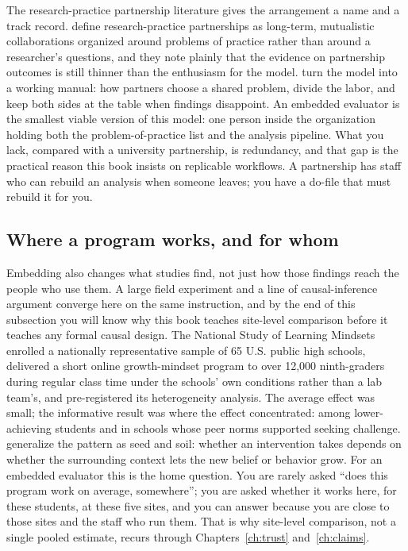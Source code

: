 \documentclass[
    a4paper,
    fontsize=10pt,
    twoside=true,
    numbers=noenddot,
]{kaobook}
\begin{document}
The research-practice partnership literature gives the arrangement a name and a track record. \textcite{coburn2016partnerships} define research-practice partnerships as long-term, mutualistic collaborations organized around problems of practice rather than around a researcher's questions, and they note plainly that the evidence on partnership outcomes is still thinner than the enthusiasm for the model. \textcite{penuel2017creating} turn the model into a working manual: how partners choose a shared problem, divide the labor, and keep both sides at the table when findings disappoint. An embedded evaluator is the smallest viable version of this model: one person inside the organization holding both the problem-of-practice list and the analysis pipeline. What you lack, compared with a university partnership, is redundancy, and that gap is the practical reason this book insists on replicable workflows. A partnership has staff who can rebuild an analysis when someone leaves; you have a do-file that must rebuild it for you.

\subsection{Where a program works, and for whom}\label{sec:ch01-home-question}
Embedding also changes what studies find, not just how those findings reach the people who use them. A large field experiment and a line of causal-inference argument converge here on the same instruction, and by the end of this subsection you will know why this book teaches site-level comparison before it teaches any formal causal design. The National Study of Learning Mindsets \parencite{yeager2019mindset} enrolled a nationally representative sample of 65 U.S. public high schools, delivered a short online growth-mindset program to over 12,000 ninth-graders during regular class time under the schools' own conditions rather than a lab team's, and pre-registered its heterogeneity analysis. The average effect was small; the informative result was where the effect concentrated: among lower-achieving students and in schools whose peer norms supported seeking challenge. \textcite{walton2020seed} generalize the pattern as seed and soil: whether an intervention takes depends on whether the surrounding context lets the new belief or behavior grow. For an embedded evaluator this is the home question. You are rarely asked \enquote{does this program work on average, somewhere}; you are asked whether it works here, for these students, at these five sites, and you can answer because you are close to those sites and the staff who run them. That is why site-level comparison, not a single pooled estimate, recurs through Chapters~\ref{ch:trust} and~\ref{ch:claims}.
\end{document}
